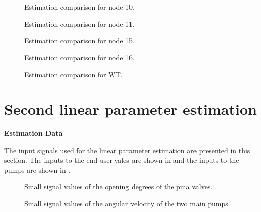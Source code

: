 \begin{figure}[H]
  \centering
  \begin{minipage}[b]{0.45\textwidth}
     
    \caption{Estimation comparison for node 10.}
  \end{minipage}
  \hfill
  \begin{minipage}[b]{0.45\textwidth}
     
    \caption{Estimation comparison for node 11.}
  \end{minipage}
\end{figure}

\begin{figure}[H]
  \centering
  \begin{minipage}[b]{0.45\textwidth}
     
    \caption{Estimation comparison for node 15.}
  \end{minipage}
  \hfill
  \begin{minipage}[b]{0.45\textwidth}
     
    \caption{Estimation comparison for node 16.}
  \end{minipage}
\end{figure}

\begin{figure}[H]
 \centering
     
    \caption{Estimation comparison for WT.}
\end{figure}

\section{Second linear parameter estimation}
\label{LinResults_2}
\textbf{Estimation Data}

The input signals used for the linear parameter estimation are presented in this section.  
The inputs to the end-user vales are shown in  and the inputs to the pumps are shown in . 


\begin{figure}[H]
  \centering
  \begin{minipage}[b]{0.45\textwidth}
     
    \caption{Small signal values of the opening degrees of the pma valves. }
    \label{fig:est_OD_data}
  \end{minipage}
  \hfill
  \begin{minipage}[b]{0.45\textwidth}
     
    \caption{Small signal values of the angular velocity of the two main pumps.}
    \label{fig:est_deltap_data}
  \end{minipage}
\end{figure}


